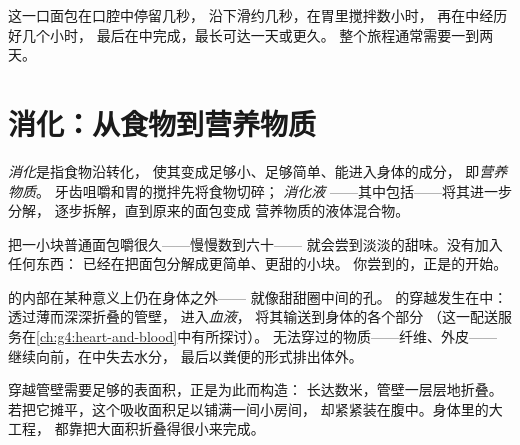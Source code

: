 \begin{example}[计算旅程的时间]\label{ex:g4:journey-of-food:timing}
这一口面包在口腔中停留几秒，
沿下滑约几秒，在胃里搅拌数小时，
再在中经历好几个小时，
最后在中完成，最长可达一天或更久。
整个旅程通常需要一到两天。
\end{example}

\section{消化：从食物到营养物质}

\begin{definition}[消化与营养物质]\label{def:g4:journey-of-food:digestion}
\emph{消化}是指食物沿转化，
使其变成足够小、足够简单、能进入身体的成分，
即\emph{营养物质}。
牙齿咀嚼和胃的搅拌先将食物切碎；
\emph{消化液}
——其中包括——将其进一步分解，
逐步拆解，直到原来的面包变成
营养物质的液体混合物。
\end{definition}

\begin{example}[面包变甜]\label{ex:g4:journey-of-food:sweet}
把一小块普通面包嚼很久——慢慢数到六十——
就会尝到淡淡的甜味。没有加入任何东西：
已经在把面包分解成更简单、更甜的小块。
你尝到的，正是的开始。
\end{example}

\begin{proposition}[穿过进入身体]\label{prop:g4:journey-of-food:absorb}
的内部在某种意义上仍在身体之外——
就像甜甜圈中间的孔。
的穿越发生在\emph{}中：透过薄而深深折叠的管壁，
进入\emph{血液}，
将其输送到身体的各个部分
（这一配送服务在\cref{ch:g4:heart-and-blood}中有所探讨）。
无法穿过的物质——纤维、外皮——
继续向前，在中失去水分，
最后以粪便的形式排出体外。
\end{proposition}
\admitted

\begin{remark}\label{rem:g4:journey-of-food:surface}
穿越管壁需要足够的表面积，正是为此而构造：
长达数米，管壁一层层地折叠。
若把它摊平，这个吸收面积足以铺满一间小房间，
却紧紧装在腹中。身体里的大工程，
都靠把大面积折叠得很小来完成。
\end{remark}


